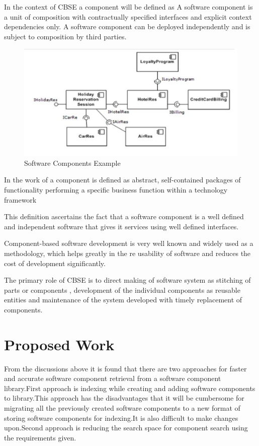 \documentclass[a4paper,12pt]{article}
\begin{document}
In the context of CBSE a component will be defined as A software component is a unit of composition
with contractually specified interfaces and explicit context
dependencies only. A software component can be deployed
independently and is subject to composition by third
parties.

\begin{figure}
	\includegraphics[scale=0.5]{softwareComponentExample.png}
	\caption{Software Components Example}
\end{figure}

In the work of \cite{componentDef} a component is defined as abstract, self-contained
packages of functionality performing a specific business function within a technology framework

This definition ascertains the fact that a software component is a well defined and independent software that gives it services using well defined interfaces.

Component-based software development is very well known and widely used as a methodology, which helps greatly in the re usability of software and reduces the cost of development significantly.

The primary role of CBSE is to direct making of software system as stitching of parts or components , development of the individual components as reusable entities and maintenance of the system developed with timely replacement of components.


\section{Proposed Work}
From the discussions above it is found that there are two approaches for faster and accurate software component retrieval from a software component library.First approach is indexing while creating and adding software components to library.This approach has the disadvantages that it will be cumbersome for migrating all the previously created software components to a new format of storing software components for indexing.It is also difficult to make changes upon.Second approach is reducing the search space for component search using the requirements given.\\
\end{document}
